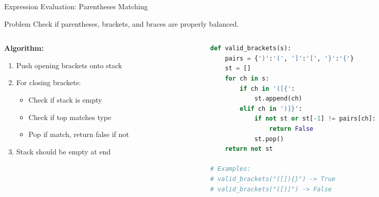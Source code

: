 \documentclass[aspectratio=169,xcolor=dvipsnames]{beamer}
\begin{document}
\begin{frame}[fragile]{Expression Evaluation: Parentheses Matching}
  \begin{exampleblock}{Problem}
    Check if parentheses, brackets, and braces are properly balanced.
  \end{exampleblock}
  
  \begin{columns}
    \begin{column}{0.45\textwidth}
      \textbf{Algorithm:}
      \begin{enumerate}
        \item Push opening brackets onto stack
        \item For closing brackets:
          \begin{itemize}
            \item Check if stack is empty
            \item Check if top matches type
            \item Pop if match, return false if not
          \end{itemize}
        \item Stack should be empty at end
      \end{enumerate}
    \end{column}
    \begin{column}{0.5\textwidth}
      \begin{lstlisting}[language=Python,basicstyle=\tiny\ttfamily]
def valid_brackets(s):
    pairs = {')':'(', ']':'[', '}':'{'}
    st = []
    for ch in s:
        if ch in '([{':
            st.append(ch)
        elif ch in ')]}':
            if not st or st[-1] != pairs[ch]:
                return False
            st.pop()
    return not st

# Examples:
# valid_brackets("([]){}") -> True
# valid_brackets("([)]") -> False
      \end{lstlisting}
    \end{column}
  \end{columns}
\end{frame}
\end{document}
